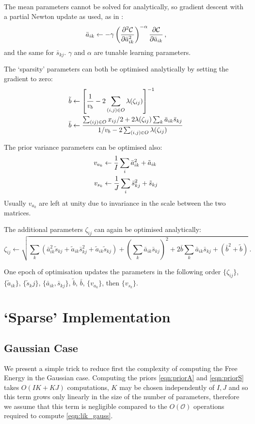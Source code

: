 \documentclass{article}
\newcommand{\obs}{O}
\newcommand{\atil}{\tilde{a}}
\newcommand{\abar}{\bar{a}}
\newcommand{\stil}{\tilde{s}}
\newcommand{\sbar}{\bar{s}}
\newcommand{\btil}{\tilde{b}}
\newcommand{\bbar}{\bar{b}}
\begin{document}
The mean parameters cannot be solved for analytically, so gradient descent with a partial Newton update as used, as in \citep{raiko2007}:
\begin{equation}
\abar_{ik}\leftarrow - \gamma\left(\frac{\partial^2\mathcal{C}}{\partial\abar_{ik}^2} \right)^{-\alpha}\frac{\partial \mathcal{C}}{\partial \abar_{ik}}\,, \notag
\end{equation}
and the same for $\sbar_{kj}$. $\gamma$ and $\alpha$ are tunable learning parameters.

The `sparsity' parameters can both be optimised analytically by setting the gradient to zero:
\begin{align}
\btil&\leftarrow \left[\frac{1}{v_b} - 2\sum_{(i,j)\in\obs}\lambda(\zeta_{ij})  \right]^{-1} \notag \\
\bbar&\leftarrow\frac{\sum_{(ij)\in\obs}x_{ij}/2+2\lambda(\zeta_{ij})\sum_k\abar_{ik}\sbar_{kj}}{1/v_b - 2\sum_{(i,j)\in\obs}\lambda(\zeta_{ij})} \notag
\end{align}

The prior variance parameters can be optimised also:
\begin{align}
v_{a_k} &\leftarrow \frac{1}{I} \sum_i\abar_{ik}^2 + \atil_{ik} \notag \\
v_{s_k} &\leftarrow \frac{1}{J} \sum_i\sbar_{kj}^2 + \stil_{kj} \notag
\end{align}
Usually $v_{a_k}$ are left at unity due to invariance in the scale between the two matrices.

The additional parameters $\zeta_{ij}$ can again be optimised analytically: 
$$\zeta_{ij}\leftarrow \sqrt{\sum_k\left(\abar_{ik}^2\stil_{kj}+\atil_{ik}\sbar^2_{kj}+\atil_{ik}\stil_{kj}\right)+
\left(\sum_{k}\abar_{ik}\sbar_{kj}\right)^2+2\bbar\sum_k\abar_{ik}\sbar_{kj}+(\bbar^2+\btil)}\,.$$

One epoch of optimisation updates the parameters in the following order $\{\zeta_{ij}\}$, $\{\atil_{ik}\}$, $\{\stil_kj\}$, $\{\abar_{ik},\sbar_{kj}\}$, $\btil$, $\bbar$, $\{v_{a_k}\}$, then $\{v_{s_k}\}$.


\section{`Sparse' Implementation} \label{sec:sparse}

\subsection{Gaussian Case}
We present a simple trick to reduce first the complexity of computing the Free Energy in the
Gaussian case. Computing the priors \eqref{eqn:priorA} and \eqref{eqn:priorS} takes $O(IK+KJ)$ computations, $K$ may be chosen independently of $I,J$ and so this term grows only linearly in the size of the number of parameters, therefore we assume that this term is negligible compared to the $O(\mathcal{O})$ operations required to compute \eqref{eqn:lik_gauss}. 
\end{document}
